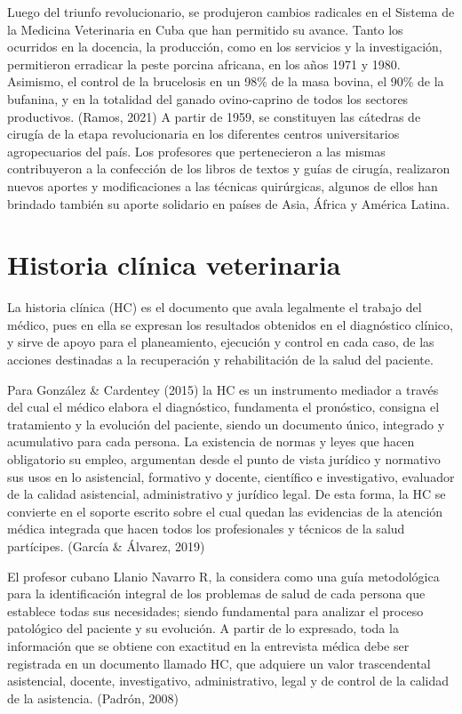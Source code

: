 Luego del triunfo revolucionario, se produjeron cambios radicales en el Sistema de la Medicina Veterinaria en Cuba que han permitido su avance. Tanto los ocurridos en la docencia, la producción, como en los servicios y la investigación, permitieron erradicar la peste porcina africana, en los años 1971 y 1980. Asimismo, el control de la brucelosis en un 98\% de la masa bovina, el 90\% de la bufanina, y en la totalidad del ganado ovino-caprino de todos los sectores productivos. (Ramos, 2021) A partir de 1959, se constituyen las cátedras de cirugía  de la etapa revolucionaria en los diferentes centros universitarios agropecuarios del país. Los profesores que pertenecieron a las mismas contribuyeron a la confección de los libros de textos y guías de cirugía, realizaron nuevos aportes y modificaciones a las técnicas quirúrgicas, algunos de ellos han brindado también su aporte solidario en países de Asia, África y América Latina. 

\section{Historia clínica veterinaria}
La historia clínica (HC) es el documento que avala legalmente el trabajo del médico, pues en ella se expresan los resultados obtenidos en el diagnóstico clínico, y sirve de apoyo para el planeamiento, ejecución y control en cada caso, de las acciones destinadas a la recuperación y rehabilitación de la salud del paciente.  

Para González \& Cardentey (2015) la HC es un instrumento mediador a través del cual el médico elabora el diagnóstico, fundamenta el pronóstico, consigna el tratamiento y la evolución del paciente, siendo un documento único, integrado y acumulativo para cada persona. La existencia de normas y leyes que hacen obligatorio su empleo, argumentan desde el punto de vista jurídico y normativo sus usos en lo asistencial, formativo y docente, científico e investigativo, evaluador de la calidad asistencial, administrativo y jurídico legal. De esta forma, la HC se convierte en el soporte escrito sobre el cual quedan las evidencias de la atención médica integrada que hacen todos los profesionales y técnicos de la salud partícipes. (García \& Álvarez, 2019) 

El profesor cubano Llanio Navarro R, la considera como una guía metodológica para la identificación integral de los problemas de salud de cada persona que establece todas sus necesidades; siendo fundamental para analizar el proceso patológico del paciente y su evolución. A partir de lo expresado, toda la información que se obtiene con exactitud en la entrevista médica debe ser registrada en un documento llamado HC, que adquiere un valor trascendental asistencial, docente, investigativo, administrativo, legal y de control de la calidad de la asistencia. (Padrón, 2008)  

